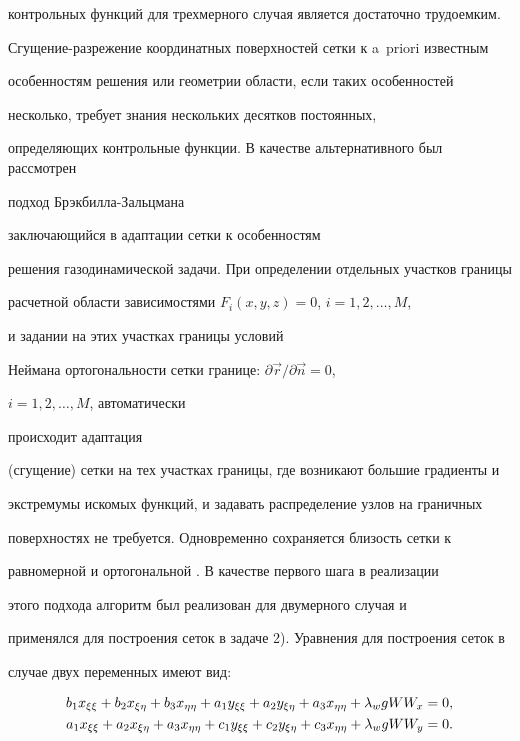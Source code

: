контрольных функций для трехмерного случая является достаточно трудоемким. 


Сгущение-разрежение координатных поверхностей сетки к a~priori известным 


особенностям решения или геометрии области, если таких особенностей 


несколько, требует знания нескольких десятков постоянных, 


определяющих контрольные функции. В качестве альтернативного был рассмотрен 


подход Брэкбилла-Зальцмана \cite{Bra} 


заключающийся в адаптации сетки к особенностям 


решения газодинамической задачи. При определении отдельных участков границы 


расчетной области зависимостями $F_i(x,y,z)=0$, $i=1,2,\dotsc,M$, 


и задании на этих участках границы условий 


Неймана ортогональности сетки границе: $\partial \Vec r/\partial \Vec n=0$, 


$i=1,2,\dotsc,M$, автоматически 


происходит адаптация 


(сгущение) сетки на тех участках границы, где возникают большие градиенты и 


экстремумы искомых функций, и задавать распределение узлов на граничных 


поверхностях не требуется. Одновременно сохраняется близость сетки к 


равномерной и ортогональной \cite{Bra}. В качестве первого шага в реализации 


этого подхода алгоритм \cite{Bra} был реализован для двумерного случая и 


применялся для построения сеток в задаче 2). Уравнения для построения сеток в 


случае двух переменных имеют вид: 


\begin{align} 


b_1x_{\xi\xi}+b_2x_{\xi\eta}+b_3x_{\eta\eta}+a_1y_{\xi\xi} 


+a_2y_{\xi\eta}+a_3x_{\eta\eta}+\lambda_wgWW_x &=0,\notag\\ 


a_1x_{\xi\xi}+a_2x_{\xi\eta}+a_3x_{\eta\eta}+ 


c_1y_{\xi\xi}+c_2y_{\xi\eta}+c_3x_{\eta\eta}+\lambda_wgWW_y &=0.


\end{align} 


